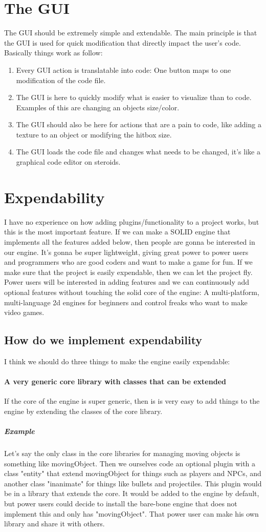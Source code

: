 \documentclass{article}
\begin{document}
	\section{The GUI}
	The GUI should be extremely simple and extendable. The main principle is that the GUI is used for quick modification that directly impact the user's code.
	Basically things work as follow:
	\begin{enumerate}
		\item Every GUI action is translatable into code: One button maps to one modification of the code file.
		\item The GUI is here to quickly modify what is easier to visualize than to code. Examples of this are changing an objects size/color.
		\item The GUI should also be here for actions that are a pain to code, like adding a texture to an object or modifying the hitbox size.
		\item The GUI loads the code file and changes what needs to be changed, it's like a graphical code editor on steroids.
	\end{enumerate}
	
	\section{Expendability}
	I have no experience on how adding plugins/functionality to a project works, but this is the most important feature. If we can make a SOLID engine that implements all the features added below, then people are gonna be interested in our engine. It's gonna be super lightweight, giving great power to power users and programmers who are good coders and want to make a game for fun. If we make sure that the project is easily expendable, then we can let the project fly. Power users will be interested in adding features and we can continuously add optional features without touching the solid core of the engine: A multi-platform, multi-language 2d engines for beginners and control freaks who want to make video games.
	\subsection{How do we implement expendability}
	I think we should do three things to make the engine easily expendable:
	\paragraph{A very generic core library with classes that can be extended}
	If the core of the engine is super generic, then is is very easy to add things to the engine by extending the classes of the core library.
	\subparagraph{Example}
	Let's say the only class in the core libraries for managing moving objects is something like movingObject. Then we ourselves code an optional plugin with a class "entity" that extend movingObject for things such as players and NPCs, and another class "inanimate" for things like bullets and projectiles. This plugin would be in a library that extends the core. It would be added to the engine by default, but power users could decide to install the bare-bone engine that does not implement this and only has "movingObject". That power user can make his own library and share it with others.
\end{document}
